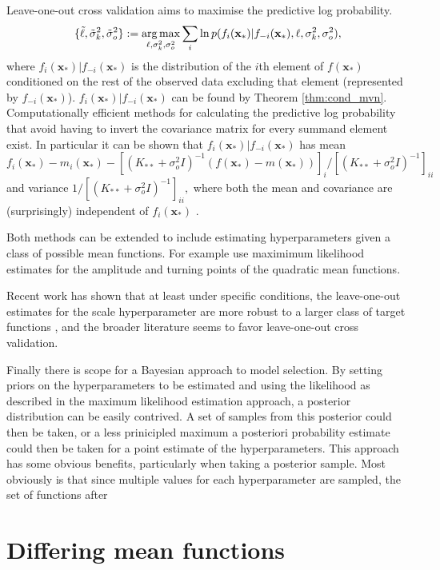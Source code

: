 Leave-one-out cross validation aims to maximise the predictive log
probability.
$$
    \{\tilde{\ell}, \tilde{\sigma}^2_k, \tilde{\sigma}^2_o\}
    := \operatorname*{arg\,max}_{\ell, \sigma^2_k, \sigma^2_o} \sum_{i}
    \ln p(f_i(\mathbf{x}_*) | f_{-i}(\mathbf{x}_*), \ell, \sigma^2_k, \sigma^2_o),
$$ where $f_i(\mathbf{x}_*) | f_{-i}(\mathbf{x}_*)$ is the distribution of the
$i$th element of $f(\mathbf{x}_*)$ conditioned on the rest of the
observed data excluding that element (represented by $f_{-i}(\mathbf{x}_*)$).
$f_i(\mathbf{x}_*) | f_{-i}(\mathbf{x}_*)$ can be found by
Theorem \ref{thm:cond_mvn}. Computationally efficient methods for calculating
the predictive log probability that avoid having to invert the covariance
matrix for every summand element exist. In particular it can be shown that
$f_i(\mathbf{x}_*) | f_{-i}(\mathbf{x}_*)$ has mean
$$
    f_i(\mathbf{x}_*) - m_i(\mathbf{x}_*)
    - [(K_{**} + \sigma^2_o I)^{-1}(f(\mathbf{x}_*) - m(\mathbf{x}_*))]_i
    /[(K_{**} + \sigma^2_o I)^{-1}]_{ii}
$$
and variance $1/[(K_{**} + \sigma^2_o I)^{-1}]_{ii},$ where both the mean and
covariance are (surprisingly) independent of $f_i(\mathbf{x}_*)$
\parencite{rasmussen_gaussian_2008}.

Both methods can be extended to include estimating hyperparameters given a class
of possible mean functions. For example \cite{gutmann_bayesian_2016} use
maximimum likelihood estimates for the amplitude and turning points of the
quadratic mean functions.

Recent work has shown that at least under specific conditions, the
leave-one-out estimates for the scale hyperparameter are more robust to a larger
class of target functions \parencite{naslidnyk_comparing_2024}, and the
broader literature seems to favor leave-one-out cross validation.

Finally there is scope for a Bayesian approach to model selection. By setting
priors on the hyperparameters to be estimated and using the likelihood as described
in the maximum likelihood estimation approach, a posterior distribution can be
easily contrived. A set of samples from this posterior could then be taken, or
a less prinicipled maximum a posteriori probability
estimate could then be taken for a point estimate of the hyperparameters. This
approach has some obvious benefits, particularly when taking a posterior
sample. Most obviously is that since multiple values for each hyperparameter are
sampled, the set of functions after

\section{Differing mean functions}

